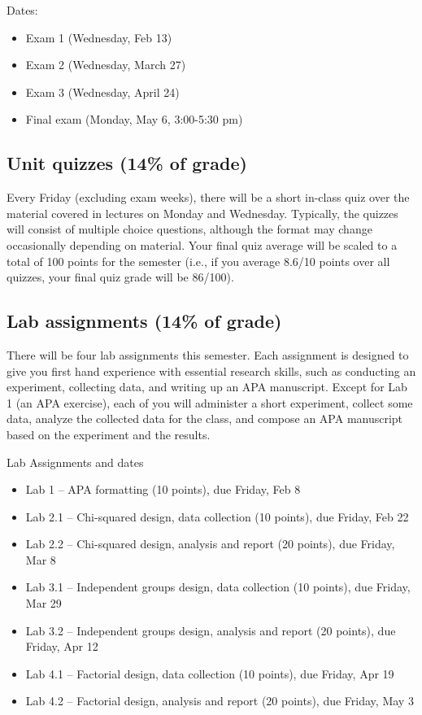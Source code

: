 \documentclass[10pt]{article}
\begin{document}
Dates:

\begin{itemize}
\item Exam 1 (Wednesday, Feb 13)
\item Exam 2 (Wednesday, March 27)
\item Exam 3 (Wednesday, April 24)
\item Final exam (Monday, May 6, 3:00-5:30 pm)
\end{itemize}

\subsection*{Unit quizzes (14\% of grade)}
\label{sec:org3e5fd16}

Every Friday (excluding exam weeks), there will be a short in-class quiz over the material covered in lectures on Monday and Wednesday. Typically, the quizzes will consist of multiple choice questions, although the format may change occasionally depending on material.  Your final quiz average will be scaled to a total of 100 points for the semester (i.e., if you average 8.6/10 points over all quizzes, your final quiz grade will be 86/100).

\subsection*{Lab assignments (14\% of grade)}
\label{sec:org012b286}

There will be four lab assignments this semester.  Each assignment is designed to give you first hand experience with essential research skills, such as conducting an experiment, collecting data, and writing up an APA manuscript.  Except for Lab 1 (an APA exercise), each of you will administer a short experiment, collect some data, analyze the collected data for the class, and compose an APA manuscript based on the experiment and the results. 

Lab Assignments and dates

\begin{itemize}
\item Lab 1 – APA formatting (10 points), due Friday, Feb 8
\item Lab 2.1 – Chi-squared design, data collection (10 points), due Friday, Feb 22
\item Lab 2.2 – Chi-squared design, analysis and report (20 points), due Friday, Mar 8
\item Lab 3.1 – Independent groups design, data collection (10 points), due Friday, Mar 29
\item Lab 3.2 – Independent groups design, analysis and report (20 points), due Friday, Apr 12
\item Lab 4.1 – Factorial design, data collection (10 points), due Friday, Apr 19
\item Lab 4.2 – Factorial design, analysis and report (20 points), due Friday, May 3
\end{itemize}
\end{document}

